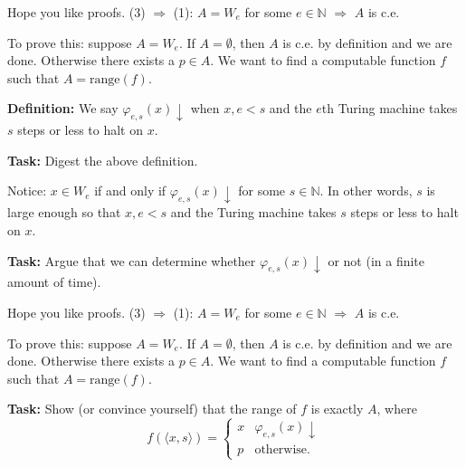 \documentclass{beamer}
\begin{document}
\begin{frame}{Hope you like proofs.}
(3) $\Rightarrow$ (1): $A = W_e$ for some $e \in \mathbb N$ $\Rightarrow$ $A$ is c.e.

\vspace{2mm}

To prove this: suppose $A = W_e$. If $A = \emptyset$, then $A$ is c.e. by definition and we are done. Otherwise there exists a $p \in A$. We want to find a computable function $f$ such that $A = \text{range}(f)$.

\vspace{2mm}

\textbf{Definition:} We say $\varphi_{e, s}(x) \downarrow$ when $x, e < s$ and the $e$th Turing machine takes $s$ steps or less to halt on $x$.

\textbf{Task:} Digest the above definition.


\vspace{2mm}

\pause

Notice: $x \in W_e$ if and only if $\varphi_{e, s}(x) \downarrow$ for some $s \in \mathbb N$. In other words, $s$ is large enough so that $x, e < s$ and the Turing machine takes $s$ steps or less to halt on $x$.

\textbf{Task:} Argue that we can determine whether $\varphi_{e, s}(x) \downarrow$ or not (in a finite amount of time).


\end{frame}

\begin{frame}{Hope you like proofs.}
(3) $\Rightarrow$ (1): $A = W_e$ for some $e \in \mathbb N$ $\Rightarrow$ $A$ is c.e.

\vspace{2mm}

To prove this: suppose $A = W_e$. If $A = \emptyset$, then $A$ is c.e. by definition and we are done. Otherwise there exists a $p \in A$. We want to find a computable function $f$ such that $A = \text{range}(f)$.

\vspace{2mm}

\textbf{Task:} Show (or convince yourself) that the range of $f$ is exactly $A$, where
$$f(\langle x, s\rangle) = \begin{cases}
x & \varphi_{e, s}(x) \downarrow\\
p & \text{otherwise.}
\end{cases}$$
\end{frame}
\end{document}
